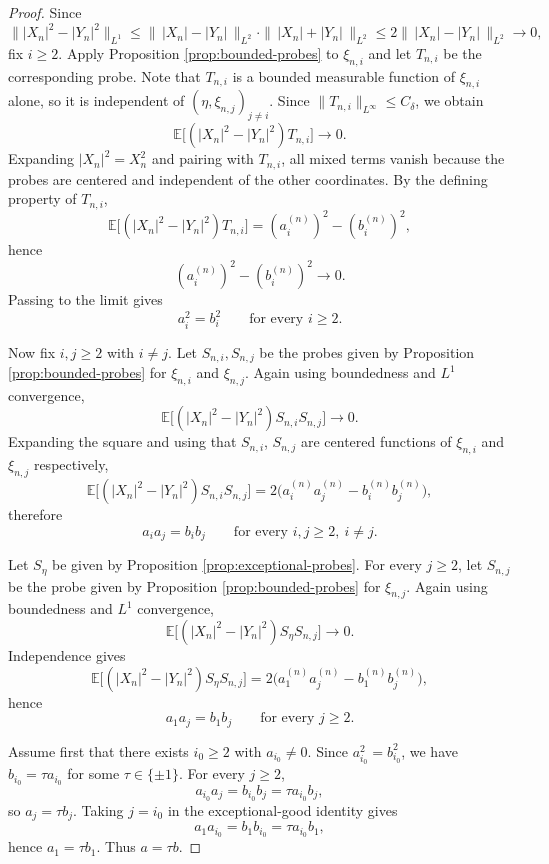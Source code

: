 \documentclass[11pt]{amsart}
\newcommand{\E}{\mathbb E}
\begin{document}
\begin{proof}
Since
\[
\bigl\| |X_n|^2 - |Y_n|^2 \bigr\|_{L^1}
\le
\|\, |X_n|-|Y_n| \,\|_{L^2}
\cdot
\|\, |X_n|+|Y_n| \,\|_{L^2}
\le
2 \|\, |X_n|-|Y_n| \,\|_{L^2}
\longrightarrow 0,
\]
fix $i \ge 2$. Apply Proposition \ref{prop:bounded-probes} to $\xi_{n,i}$ and
let $T_{n,i}$ be the corresponding probe. Note that $T_{n,i}$ is a bounded
measurable function of $\xi_{n,i}$ alone, so it is independent of
$(\eta,\xi_{n,j})_{j \ne i}$. Since $\|T_{n,i}\|_{L^\infty} \le
C_\delta$, we obtain
\[
\E\bigl[(|X_n|^2-|Y_n|^2) T_{n,i}\bigr] \longrightarrow 0.
\]
Expanding $|X_n|^2 = X_n^2$ and pairing with $T_{n,i}$, all mixed terms
vanish because the probes are centered and independent of the other
coordinates. By the defining property of $T_{n,i}$,
\[
\E\bigl[(|X_n|^2-|Y_n|^2) T_{n,i}\bigr]
=
(a_i^{(n)})^2 - (b_i^{(n)})^2,
\]
hence
\[
(a_i^{(n)})^2 - (b_i^{(n)})^2 \longrightarrow 0.
\]
Passing to the limit gives
\[
a_i^2 = b_i^2
\qquad
\text{for every } i \ge 2.
\]

Now fix $i,j \ge 2$ with $i \ne j$. Let $S_{n,i},S_{n,j}$ be the probes given by
Proposition \ref{prop:bounded-probes} for $\xi_{n,i}$ and $\xi_{n,j}$.
Again using boundedness and $L^1$ convergence,
\[
\E\bigl[(|X_n|^2-|Y_n|^2) S_{n,i} S_{n,j}\bigr] \longrightarrow 0.
\]
Expanding the square and using that $S_{n,i}$, $S_{n,j}$ are centered functions
of $\xi_{n,i}$ and $\xi_{n,j}$ respectively,
\[
\E\bigl[(|X_n|^2-|Y_n|^2) S_{n,i} S_{n,j}\bigr]
=
2\bigl(a_i^{(n)} a_j^{(n)} - b_i^{(n)} b_j^{(n)}\bigr),
\]
therefore
\[
a_i a_j = b_i b_j
\qquad
\text{for every } i,j \ge 2,\ i \ne j.
\]

Let $S_\eta$ be given by Proposition \ref{prop:exceptional-probes}. For every
$j \ge 2$, let $S_{n,j}$ be the probe given by Proposition
\ref{prop:bounded-probes} for $\xi_{n,j}$. Again using boundedness and
$L^1$ convergence,
\[
\E\bigl[(|X_n|^2-|Y_n|^2) S_\eta S_{n,j}\bigr] \longrightarrow 0.
\]
Independence gives
\[
\E\bigl[(|X_n|^2-|Y_n|^2) S_\eta S_{n,j}\bigr]
=
2\bigl(a_1^{(n)} a_j^{(n)} - b_1^{(n)} b_j^{(n)}\bigr),
\]
hence
\[
a_1 a_j = b_1 b_j
\qquad
\text{for every } j \ge 2.
\]

Assume first that there exists $i_0 \ge 2$ with $a_{i_0} \ne 0$. Since
$a_{i_0}^2=b_{i_0}^2$, we have $b_{i_0} = \tau a_{i_0}$ for some
$\tau \in \{\pm 1\}$. For every $j \ge 2$,
\[
a_{i_0} a_j = b_{i_0} b_j = \tau a_{i_0} b_j,
\]
so $a_j = \tau b_j$. Taking $j=i_0$ in the exceptional-good identity gives
\[
a_1 a_{i_0} = b_1 b_{i_0} = \tau a_{i_0} b_1,
\]
hence $a_1 = \tau b_1$. Thus $a=\tau b$.


\end{proof}
\end{document}
